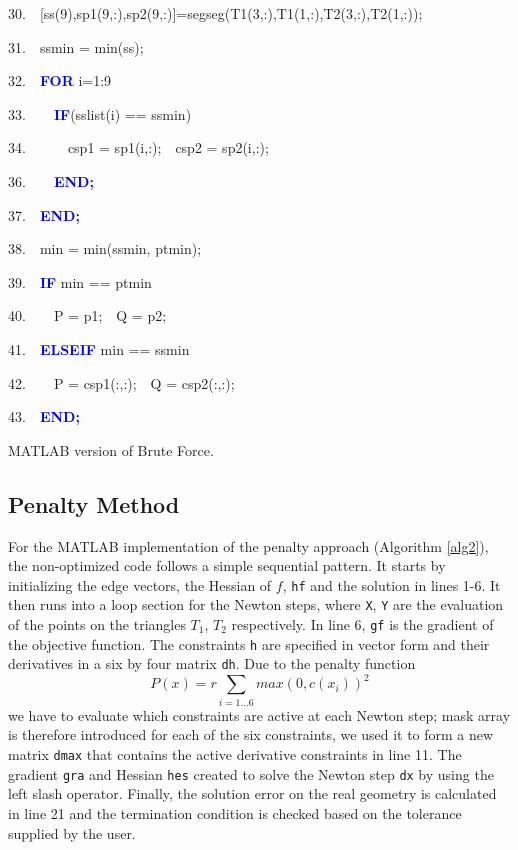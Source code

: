 \documentclass[times,12pt]{ACME2015article}
\newenvironment{lyxcode}
{\par\begin{list}{}{
\setlength{\rightmargin}{\leftmargin}
\setlength{\listparindent}{0pt}%
\raggedright
\setlength{\itemsep}{0pt}
\setlength{\parsep}{0pt}
\normalfont\ttfamily}%
 \item[]}
{\end{list}}
\begin{document}
\begin{algorithm}
\begin{lyxcode}
30.~~[ss(9),sp1(9,:),sp2(9,:)]=segseg(T1(3,:),T1(1,:),T2(3,:),T2(1,:));

31.~~ssmin = min(ss);

32.~~\textbf{\textcolor{blue}{FOR}} i=1:9

33.~~~~\textbf{\textcolor{blue}{IF}}(sslist(i) == ssmin)

34.~~~~~~csp1 = sp1(i,:);~~csp2 = sp2(i,:);

36.~~~~\textbf{\textcolor{blue}{END;}}

37.~~\textbf{\textcolor{blue}{END;}}

38.~~min = min(ssmin, ptmin);

39.~~\textbf{\textcolor{blue}{IF}} min == ptmin

40.~~~~P = p1;~~Q = p2;

41.~~\textbf{\textcolor{blue}{ELSEIF}} min == ssmin

42.~~~~P = csp1(:,:);~~Q = csp2(:,:);

43.~~\textbf{\textcolor{blue}{END;}}
\end{lyxcode}
\protect\caption{\label{alg9}MATLAB version of Brute Force.}
\end{algorithm}



\clearpage

\subsection{Penalty Method}

For the MATLAB implementation of the penalty approach (Algorithm \ref{alg2}), the non-optimized code follows a simple sequential pattern. It starts by initializing the edge vectors, the Hessian of $f$, \texttt{hf} and the solution in lines 1-6. It then runs into a loop section for the Newton steps, where \texttt{X}, \texttt{Y} are the evaluation of the points on the triangles $T_1$, $T_2$ respectively. In line 6, \texttt{gf} is the gradient of the objective function. The constraints \texttt{h} are specified in vector form and their derivatives in a six by four matrix \texttt{dh}. Due to the penalty function 
$$P(x)=r\sum_{i=1...6}max(0,c(x_{i}))^{2}$$
 we have to evaluate which constraints are active at each Newton step; mask array is therefore introduced for each of the six constraints, we used it to form a new matrix \texttt{dmax} that contains the active derivative constraints in line 11. The gradient \texttt{gra} and Hessian \texttt{hes} created to solve the Newton step \texttt{dx} by using the left slash operator. Finally, the solution error on the real geometry is calculated in line 21 and the termination condition is checked based on the tolerance supplied by the user.
 
\end{document}
